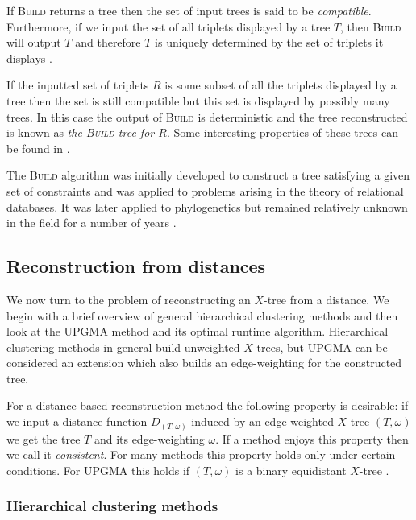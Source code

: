 If \textsc{Build} returns a tree then the set of input trees is said to be
\textit{compatible}.  Furthermore, if we input the set of all triplets
displayed by a tree $T$, then \textsc{Build} will output $T$ and therefore $T$
is uniquely determined by the set of triplets it displays
\cite{semple2003phylogenetics}.

If the inputted set of triplets $R$ is some subset of all the triplets
displayed by a tree then the set is still compatible but this set is displayed
by possibly many trees.  In this case the output of \textsc{Build} is
deterministic and the tree reconstructed is known as \textit{the
  \textsc{Build} tree for $R$}.  Some interesting properties of these trees
can be found in \cite[Section 2.5.2]{bryant97buildingtrees}.

The \textsc{Build} algorithm was initially developed to construct a tree
satisfying a given set of constraints and was applied to problems arising in
the theory of relational databases.  It was later applied to phylogenetics but
remained relatively unknown in the field for a number of years
\cite{steel1992complexity,bryant04supertree}.

\subsection{Reconstruction from distances}
\label{sec:constr-from-dist}

We now turn to the problem of reconstructing an $X$-tree from a distance.  We
begin with a brief overview of general hierarchical clustering methods and
then look at the UPGMA method \cite{sokal1958statistical} and its optimal
runtime algorithm.  Hierarchical clustering methods in general build
unweighted $X$-trees, but UPGMA can be considered an extension which also
builds an edge-weighting for the constructed tree.

For a distance-based reconstruction method the following property is
desirable: if we input a distance function $D_{(T,\omega)}$ induced by an
edge-weighted $X$-tree $(T,\omega)$ we get the tree $T$ and its edge-weighting
$\omega$.  If a method enjoys this property then we call it
\textit{consistent}.  For many methods this property holds only under certain
conditions.  For UPGMA this holds if $(T,\omega)$ is a binary equidistant
$X$-tree \cite{durbin1998biological}.

\subsubsection{Hierarchical clustering methods}
\label{sec:hier-clust-meth}

